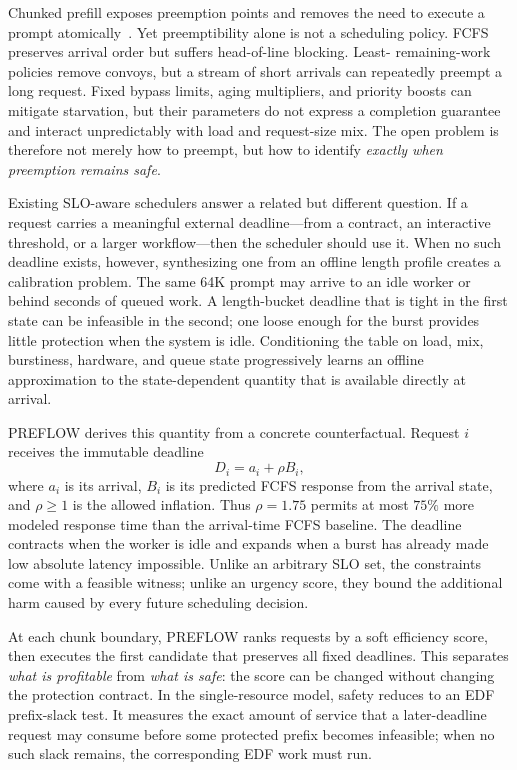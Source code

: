 \documentclass{article}
\newcommand{\preflow}{\textnormal{\textsc{PREFLOW}}}
\begin{document}
Chunked prefill exposes preemption points and removes the need to execute a
prompt atomically~\citep{agrawal2024sarathi,agrawal2024medha,
hsieh2026flowprefill}.  Yet preemptibility alone is not a scheduling policy.
FCFS preserves arrival order but suffers head-of-line blocking.  Least-
remaining-work policies remove convoys, but a stream of short arrivals can
repeatedly preempt a long request.  Fixed bypass limits, aging multipliers, and
priority boosts can mitigate starvation, but their parameters do not express a
completion guarantee and interact unpredictably with load and request-size
mix.  The open problem is therefore not merely how to preempt, but how to
identify \emph{exactly when preemption remains safe}.

Existing SLO-aware schedulers answer a related but different question.  If a
request carries a meaningful external deadline---from a contract, an
interactive threshold, or a larger workflow---then the scheduler should use
it.  When no such deadline exists, however, synthesizing one from an offline
length profile creates a calibration problem.  The same 64K prompt may arrive
to an idle worker or behind seconds of queued work.  A length-bucket deadline
that is tight in the first state can be infeasible in the second; one loose
enough for the burst provides little protection when the system is idle.
Conditioning the table on load, mix, burstiness, hardware, and queue state
progressively learns an offline approximation to the state-dependent quantity
that is available directly at arrival.

\preflow{} derives this quantity from a concrete counterfactual.  Request $i$
receives the immutable deadline
\begin{equation}
    D_i = a_i + \rho B_i,
    \label{eq:deadline-intro}
\end{equation}
where $a_i$ is its arrival, $B_i$ is its predicted FCFS response from the
arrival state, and $\rho\geq1$ is the allowed inflation.  Thus $\rho=1.75$
permits at most $75\%$ more modeled response time than the arrival-time FCFS
baseline.  The deadline contracts when the worker is idle and expands when a
burst has already made low absolute latency impossible.  Unlike an arbitrary
SLO set, the constraints come with a feasible witness; unlike an urgency score,
they bound the additional harm caused by every future scheduling decision.

At each chunk boundary, \preflow{} ranks requests by a soft efficiency score,
then executes the first candidate that preserves all fixed deadlines.  This
separates \emph{what is profitable} from \emph{what is safe}: the score can be
changed without changing the protection contract.  In the single-resource
model, safety reduces to an EDF prefix-slack test.  It measures the exact amount
of service that a later-deadline request may consume before some protected
prefix becomes infeasible; when no such slack remains, the corresponding EDF
work must run.
\end{document}
